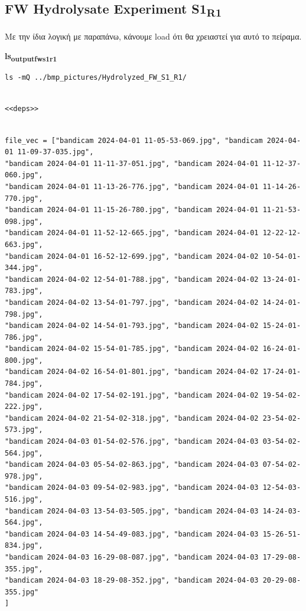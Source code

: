 \documentclass[11pt]{article}
\begin{document}
\subsection{FW Hydrolysate Experiment S1\textsubscript{R1}}
\label{sec:org9e06688}
Με την ίδια λογική με παραπάνω, κάνουμε load ότι θα χρειαστεί για αυτό το πείραμα.

\textbf{ls\textsubscript{output}\textsubscript{fw}\textsubscript{s1}\textsubscript{r1}}
\begin{verbatim}
ls -mQ ../bmp_pictures/Hydrolyzed_FW_S1_R1/
\end{verbatim}

\begin{verbatim}

<<deps>>

\end{verbatim}

\begin{verbatim}

file_vec = ["bandicam 2024-04-01 11-05-53-069.jpg", "bandicam 2024-04-01 11-09-37-035.jpg",
"bandicam 2024-04-01 11-11-37-051.jpg", "bandicam 2024-04-01 11-12-37-060.jpg",
"bandicam 2024-04-01 11-13-26-776.jpg", "bandicam 2024-04-01 11-14-26-770.jpg",
"bandicam 2024-04-01 11-15-26-780.jpg", "bandicam 2024-04-01 11-21-53-098.jpg",
"bandicam 2024-04-01 11-52-12-665.jpg", "bandicam 2024-04-01 12-22-12-663.jpg",
"bandicam 2024-04-01 16-52-12-699.jpg", "bandicam 2024-04-02 10-54-01-344.jpg",
"bandicam 2024-04-02 12-54-01-788.jpg", "bandicam 2024-04-02 13-24-01-783.jpg",
"bandicam 2024-04-02 13-54-01-797.jpg", "bandicam 2024-04-02 14-24-01-798.jpg",
"bandicam 2024-04-02 14-54-01-793.jpg", "bandicam 2024-04-02 15-24-01-786.jpg",
"bandicam 2024-04-02 15-54-01-785.jpg", "bandicam 2024-04-02 16-24-01-800.jpg",
"bandicam 2024-04-02 16-54-01-801.jpg", "bandicam 2024-04-02 17-24-01-784.jpg",
"bandicam 2024-04-02 17-54-02-191.jpg", "bandicam 2024-04-02 19-54-02-222.jpg",
"bandicam 2024-04-02 21-54-02-318.jpg", "bandicam 2024-04-02 23-54-02-573.jpg",
"bandicam 2024-04-03 01-54-02-576.jpg", "bandicam 2024-04-03 03-54-02-564.jpg",
"bandicam 2024-04-03 05-54-02-863.jpg", "bandicam 2024-04-03 07-54-02-978.jpg",
"bandicam 2024-04-03 09-54-02-983.jpg", "bandicam 2024-04-03 12-54-03-516.jpg",
"bandicam 2024-04-03 13-54-03-505.jpg", "bandicam 2024-04-03 14-24-03-564.jpg",
"bandicam 2024-04-03 14-54-49-083.jpg", "bandicam 2024-04-03 15-26-51-834.jpg",
"bandicam 2024-04-03 16-29-08-087.jpg", "bandicam 2024-04-03 17-29-08-355.jpg",
"bandicam 2024-04-03 18-29-08-352.jpg", "bandicam 2024-04-03 20-29-08-355.jpg"
]
\end{verbatim}
\end{document}
